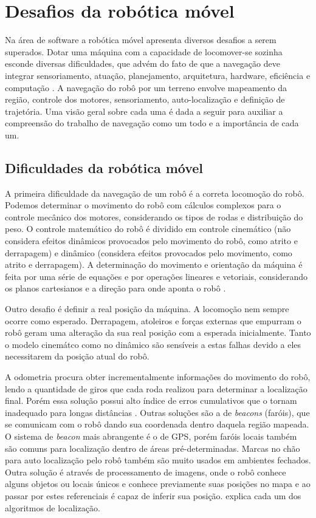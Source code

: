 \section{Desafios da robótica móvel}

Na área de software a robótica móvel apresenta diversos desafios a serem superados. Dotar uma máquina com a capacidade de locomover-se sozinha esconde diversas dificuldades, que advém do fato de que a navegação deve integrar sensoriamento, atuação, planejamento, arquitetura, hardware, eficiência e computação \cite{Souza2008}. A navegação do robô por um terreno envolve mapeamento da região, controle dos motores, sensoriamento, auto-localização e definição de trajetória. Uma visão geral sobre cada uma é dada a seguir para auxiliar a compreensão do trabalho de navegação como um todo e a importância de cada um.

\subsection{Dificuldades da robótica móvel}

A primeira dificuldade da navegação de um robô é a correta locomoção do robô. Podemos determinar o movimento do robô com cálculos complexos para o controle mecânico dos motores, considerando os tipos de rodas e distribuição do peso. O controle matemático do robô é dividido em controle cinemático (não considera efeitos dinâmicos provocados pelo movimento do robô, como atrito e derrapagem) e dinâmico (considera efeitos provocados pelo movimento, como atrito e derrapagem). A determinação do movimento e orientação da máquina é feita por uma série de equações e por operações lineares e vetoriais, considerando os planos cartesianos e a direção para onde aponta o robô \cite{Siegwart2004}.

Outro desafio é definir a real posição da máquina. A locomoção nem sempre ocorre como esperado. Derrapagem, atoleiros e forças externas que empurram o robô geram uma alteração da sua real posição com a esperada inicialmente. Tanto o modelo cinemátco como no dinâmico são sensíveis a estas falhas devido a eles necessitarem da posição atual do robô. 

A odometria procura obter incrementalmente informações do movimento do robô, lendo a quantidade de giros que cada roda realizou para determinar a localização final. Porém essa solução possui alto índice de erros cumulativos que o tornam inadequado para longas distâncias \cite{Pereira2003}. Outras soluções são a de \textit{beacons} (faróis), que se comunicam com o robô dando sua coordenada dentro daquela região mapeada. O sistema de \textit{beacon} mais abrangente é o de GPS, porém faróis locais também são comuns para localização dentro de áreas pré-determinadas. Marcas no chão para auto localização pelo robô também são muito usados em ambientes fechados. Outra solução é através de processamento de imagens, onde o robô conhece alguns objetos ou locais únicos e conhece previamente suas posições no mapa e ao passar por estes referenciais é capaz de inferir sua posição. \cite{Borenstein1996} explica cada um dos algoritmos de localização. 

